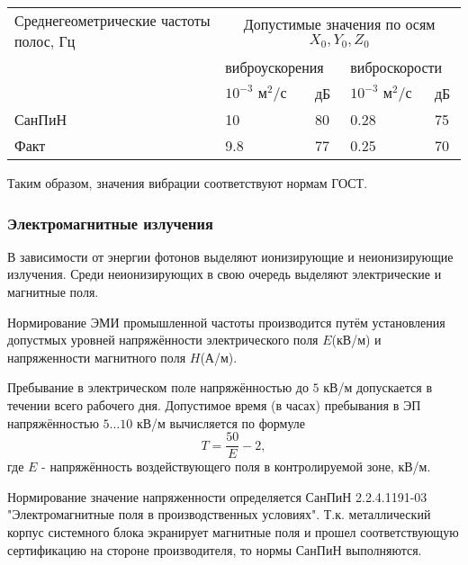 \begin{table}[H]
\begin{center}
\begin{tabular}{|p{4.1cm}|p{2cm}|p{1cm}|p{2cm}|p{1cm}|}
\hline
Среднегеометрические частоты полос, Гц & \multicolumn{4}{|c|}{Допустимые значения по осям $X_0, Y_0, Z_0$  } \\
\cline{2-5}
       & \multicolumn{2}{|l|}{виброускорения                   }&\multicolumn{2}{|l|}{ виброскорости                    } \\
\cline{2-5}
       & $10^{-3} \mbox{ м}^2 / \mbox{с}$  & дБ & $10^{-3} \mbox{ м}^2 / \mbox{с}$  & дБ   \\
\hline
СанПиН & 10                                & 80 & 0.28                              & 75   \\
\hline
Факт   & 9.8                               & 77 & 0.25                              & 70   \\
\hline
\end{tabular}
\end{center}
\end{table}

Таким образом, значения вибрации соответствуют нормам ГОСТ.

\subsubsection{Электромагнитные излучения}

В зависимости от энергии фотонов выделяют ионизирующие и неионизирующие излу\-чения. Среди неионизирующих в свою очередь выделяют электрические и магнитные поля.

Нормирование ЭМИ промышленной частоты производится путём установления допус\-тмых уровней напряжённости электрического поля $E$(кВ/м) и напряженности маг\-нитного поля $H$(А/м).

Пребывание в электрическом поле напряжённостью до $5$ кВ/м допускается в течении всего рабочего дня. Допустимое время (в часах) пребывания в ЭП напряжённостью $5 \ldots 10$ кВ/м вычисляется по формуле
$$
T = \frac{50}{E} - 2,
$$
где $E$ - напряжённость воздействующего поля в контролируемой зоне, кВ/м.

Нормирование значение напряженности определяется СанПиН 2.2.4.1191-03 "Электро\-магнитные поля в производственных условиях". Т.к. металлический корпус системного блока экранирует магнитные поля и прошел соответствующую сертификацию на стороне производителя, то нормы СанПиН выполняются.

